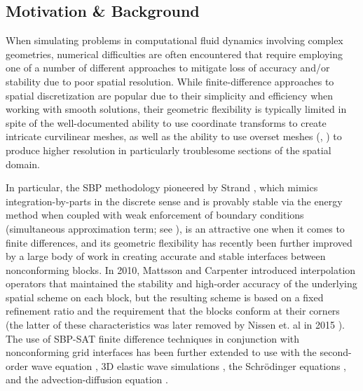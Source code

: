 \subsection{Motivation \& Background} \label{sec:hybrid_goals}


When simulating problems in computational fluid dynamics involving complex
geometries, numerical difficulties are often encountered that require
employing one of a number of different approaches to mitigate loss of accuracy and/or stability
due to poor spatial resolution. While finite-difference approaches to spatial
discretization are popular due to their simplicity and efficiency when working
with smooth solutions, their geometric flexibility is typically limited in spite
of the well-documented ability to use coordinate transforms to create intricate
curvilinear meshes, as well as the ability to use overset meshes (\cite{bodony2011provably}, \cite{noack2005summary})
to produce higher resolution in particularly troublesome sections of the spatial domain.

In particular, the SBP methodology pioneered by Strand \cite{strand1994summation},
which mimics
integration-by-parts in the discrete sense and is provably stable via the energy method when coupled with weak enforcement of boundary conditions (simultaneous approximation term; see \cite{svard2007stable}),
is an attractive one when it comes to finite differences, and its geometric
flexibility has recently been further improved by a large body of work in creating
accurate and stable interfaces between nonconforming blocks. In 2010, Mattsson and
Carpenter \cite{mattsson2010stable} introduced interpolation operators that maintained
the stability and high-order accuracy of the underlying spatial scheme on each block,
but the resulting scheme is based on a fixed refinement ratio and the requirement that
the blocks conform at their corners (the latter of these characteristics was
later removed by Nissen et. al in 2015 \cite{nissen2015stable}). The use of SBP-SAT finite
difference techniques in conjunction with nonconforming grid interfaces has been further
extended to use with the second-order wave equation \cite{wang2016high}, 3D elastic wave
simulations \cite{gao2020energy}, the Schr{\"o}dinger equations \cite{nissen2012stability},
and the advection-diffusion equation \cite{lundquist2018hybrid}. 

